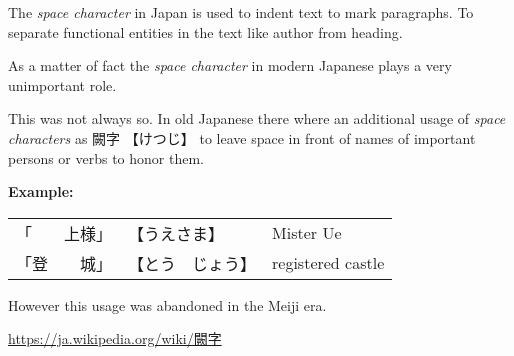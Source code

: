 The \textit{space character} in Japan is used to indent text to mark
paragraphs. To separate functional entities in the text like author from
heading. 

As a matter of fact the \textit{space character} in modern Japanese plays a
very unimportant role. 

This was not always so. In old Japanese there where an additional usage of
\textit{space characters} as {闕字} {【けつじ】} to leave space in front of
names of important persons or verbs to honor them.

\smallskip
\textbf{Example:}

\begin{center}\Padding\begin{tabular}{p{4cm}p{3cm}p{4cm}}
 {「　　上様」} & {【うえさま】}      & Mister Ue \\
 {「登　　城」} &  {【とう　じょう】} & registered castle\\
\end{tabular}\end{center}
\smallskip

However this usage was abandoned in the Meiji era. 

\Link \href{https://ja.wikipedia.org/wiki/%E9%97%95%E5%AD%97}{https://ja.wikipedia.org/wiki/闕字}

